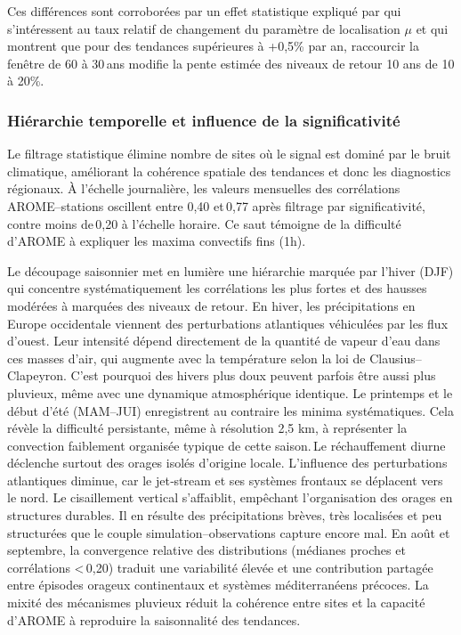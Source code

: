 \documentclass[
  article,
  nofooter,
  noheadings]{jss}
\begin{document}
Ces différences sont corroborées par un effet statistique expliqué par
\citet{DeGaetano2018} qui s'intéressent au taux relatif de changement du
paramètre de localisation \(\mu\) et qui montrent que pour des tendances
supérieures à +0,5\% par an, raccourcir la fenêtre de 60 à 30\,ans
modifie la pente estimée des niveaux de retour 10 ans de 10 à 20\%.

\subsubsection{Hiérarchie temporelle et influence de la
significativité}\label{hiuxe9rarchie-temporelle-et-influence-de-la-significativituxe9}

Le filtrage statistique élimine nombre de sites où le signal est dominé
par le bruit climatique, améliorant la cohérence spatiale des tendances
et donc les diagnostics régionaux. À l'échelle journalière, les valeurs
mensuelles des corrélations AROME--stations oscillent entre 0,40
et\,0,77 après filtrage par significativité, contre moins de\,0,20 à
l'échelle horaire. Ce saut témoigne de la difficulté d'AROME à expliquer
les maxima convectifs fins (1h).

Le découpage saisonnier met en lumière une hiérarchie marquée par
l'hiver (DJF) qui concentre systématiquement les corrélations les plus
fortes et des hausses modérées à marquées des niveaux de retour. En
hiver, les précipitations en Europe occidentale viennent des
perturbations atlantiques véhiculées par les flux d'ouest. Leur
intensité dépend directement de la quantité de vapeur d'eau dans ces
masses d'air, qui augmente avec la température selon la loi de
Clausius--Clapeyron. C'est pourquoi des hivers plus doux peuvent parfois
être aussi plus pluvieux, même avec une dynamique atmosphérique
identique. Le printemps et le début d'été (MAM--JUI) enregistrent au
contraire les minima systématiques. Cela révèle la difficulté
persistante, même à résolution 2,5 km, à représenter la\,convection
faiblement organisée typique de cette saison.\,Le réchauffement diurne
déclenche surtout des orages isolés d'origine locale. L'influence des
perturbations atlantiques diminue, car le jet‑stream et ses systèmes
frontaux se déplacent vers le nord. Le cisaillement vertical
s'affaiblit, empêchant l'organisation des orages en structures durables.
Il en résulte des précipitations brèves, très localisées et peu
structurées que le couple simulation--observations capture encore mal.
En août et septembre, la convergence relative des distributions
(médianes proches et corrélations \textless\,0,20) traduit une
variabilité élevée et une contribution partagée entre épisodes orageux
continentaux et systèmes méditerranéens précoces. La mixité des
mécanismes pluvieux réduit la cohérence entre sites et la capacité
d'AROME à reproduire la saisonnalité des tendances.
\end{document}
